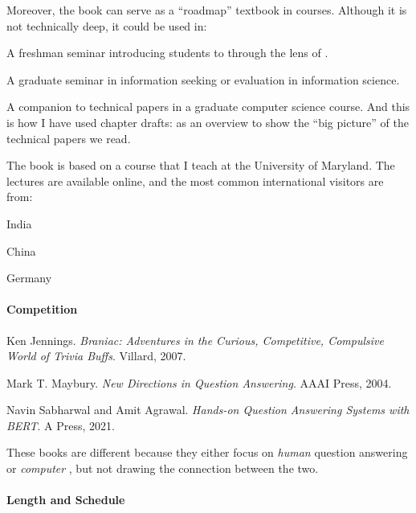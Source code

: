 Moreover, the book can serve as a ``roadmap'' textbook in courses.
Although it is not technically deep, it could be used in:
\begin{itemize*}
        \item A freshman seminar introducing students to 
          through the lens of .
        \item A graduate seminar in information seeking or evaluation
          in information science.
        \item A companion to technical papers in a graduate computer
          science course.  And this is how I have used chapter drafts:
          as an overview to show the ``big picture'' of the technical
          papers we read.
\end{itemize*}

The book is based on a course that I teach at the University of
Maryland.  The lectures are available online, and the most common
international visitors are from:
\begin{itemize*}
\item India
\item China
  \item Germany
\end{itemize*}

\paragraph{Competition}

\begin{itemize*}
        \item Ken Jennings.  \textit{Braniac: Adventures in the Curious,
        Competitive, Compulsive World of Trivia Buffs}.  Villard, 2007.

        \item Mark T. Maybury.  \textit{New Directions in Question
        Answering}.  AAAI Press, 2004.

        \item Navin Sabharwal and Amit Agrawal.  \textit{Hands-on Question
        Answering Systems with BERT}.  A Press, 2021.
\end{itemize*}

These books are different because they either focus on \emph{human}
question answering or \emph{computer} , but not
drawing the connection between the two.

\paragraph{Length and Schedule}

